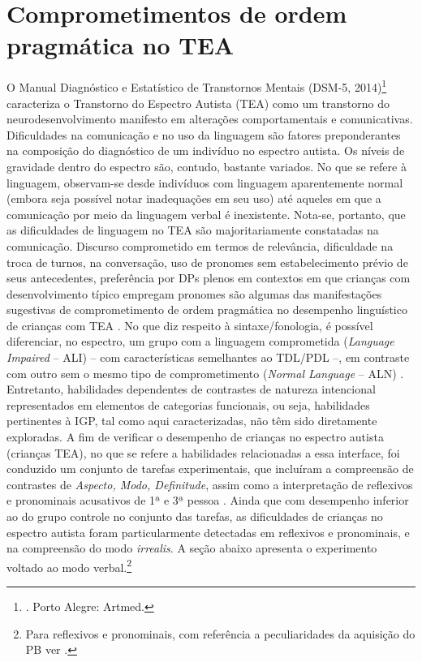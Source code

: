 \documentclass[output=paper,colorlinks,citecolor=brown,booklanguage=portuguese]{langscibook}
\begin{document}
\section{Comprometimentos de ordem pragmática no TEA }\label{sec:quatrocap15}
O Manual Diagnóstico e Estatístico de Transtornos Mentais (DSM-5, 2014)\footnote{\citet{APA2014}. Porto Alegre: Artmed.} caracteriza o Transtorno do Espectro Autista (TEA) como um transtorno do neurodesenvolvimento manifesto em alterações comportamentais e comunicativas. Dificuldades na comunicação e no uso da linguagem são fatores preponderantes na composição do diagnóstico de um indivíduo no espectro autista. Os níveis de gravidade dentro do espectro são, contudo, bastante variados. No que se refere à linguagem, observam-se desde indivíduos com linguagem aparentemente normal (embora seja possível notar inadequações em seu uso) até aqueles em que a comunicação por meio da linguagem verbal é inexistente. Nota-se, portanto, que as dificuldades de linguagem no TEA são majoritariamente constatadas na comunicação. Discurso comprometido em termos de relevância, dificuldade na troca de turnos, na conversação, uso de pronomes sem estabelecimento prévio de seus antecedentes, preferência por DPs plenos em contextos em que crianças com desenvolvimento típico empregam pronomes são algumas das manifestações sugestivas de comprometimento de ordem pragmática no desempenho linguístico de crianças com TEA \citep{APA2014, Longchamps2014, Ribeiro2019}. No que diz respeito à sintaxe/fonologia, é possível diferenciar, no espectro, um grupo com a linguagem comprometida (\emph{Language Impaired} – ALI) – com características semelhantes ao TDL/PDL –, em contraste com outro sem o mesmo tipo de comprometimento (\emph{Normal Language} – ALN) \citep{Boucher2012}. Entretanto, habilidades dependentes de contrastes de natureza intencional representados em elementos de categorias funcionais, ou seja, habilidades pertinentes à IGP, tal como aqui caracterizadas, não têm sido diretamente exploradas. A fim de verificar o desempenho de crianças no espectro autista (crianças TEA), no que se refere a habilidades relacionadas a essa interface, foi conduzido um conjunto de tarefas experimentais, que incluíram a compreensão de contrastes de \emph{Aspecto, Modo, Definitude}, assim como a interpretação de reflexivos e pronominais acusativos de 1ª e 3ª pessoa \citep{Ribeiro2019}. Ainda que com desempenho inferior ao do grupo controle no conjunto das tarefas, as dificuldades de crianças no espectro autista foram particularmente detectadas em reflexivos e pronominais, e na compreensão do modo \emph{irrealis}. A seção abaixo apresenta o experimento voltado ao modo verbal.\footnote{Para reflexivos e pronominais, com referência a peculiaridades da aquisição do PB ver \citet{Correa2020a}.}  
\end{document}
